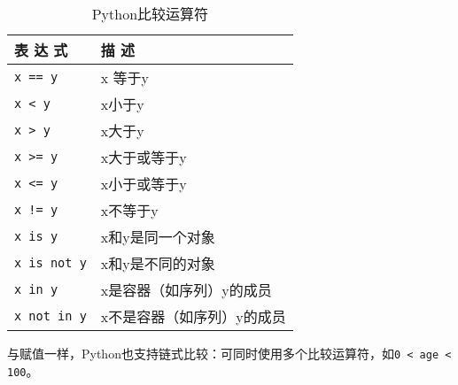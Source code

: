 \begin{table}
    \caption{Python比较运算符}
    \label{python comparison operator}
    \centering
    \begin{tabular}{ll}
        \hline
        表 达 式             & 描 述            \\
        \hline
        \verb|x == y|     & x 等于y          \\
        \verb|x < y|      & x小于y           \\
        \verb|x > y|      & x大于y           \\
        \verb|x >= y|     & x大于或等于y        \\
        \verb|x <= y|     & x小于或等于y        \\
        \verb|x != y|     & x不等于y          \\
        \verb|x is y|     & x和y是同一个对象      \\
        \verb|x is not y| & x和y是不同的对象      \\
        \verb|x in y|     & x是容器（如序列）y的成员  \\
        \verb|x not in y| & x不是容器（如序列）y的成员 \\
        \hline
    \end{tabular}
\end{table}
与赋值一样，Python也支持链式比较：可同时使用多个比较运算符，如\verb|0 < age < 100|。

